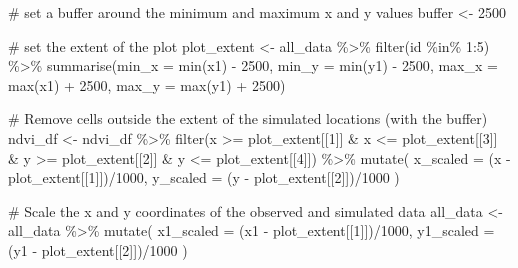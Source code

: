 \documentclass[
  letterpaper,
  DIV=11,
  numbers=noendperiod]{scrartcl}
\newenvironment{Shaded}{\begin{snugshade}}{\end{snugshade}}
\newcommand{\AttributeTok}[1]{\textcolor[rgb]{0.40,0.45,0.13}{#1}}
\newcommand{\CommentTok}[1]{\textcolor[rgb]{0.37,0.37,0.37}{#1}}
\newcommand{\DecValTok}[1]{\textcolor[rgb]{0.68,0.00,0.00}{#1}}
\newcommand{\FunctionTok}[1]{\textcolor[rgb]{0.28,0.35,0.67}{#1}}
\newcommand{\NormalTok}[1]{\textcolor[rgb]{0.00,0.23,0.31}{#1}}
\newcommand{\OtherTok}[1]{\textcolor[rgb]{0.00,0.23,0.31}{#1}}
\newcommand{\SpecialCharTok}[1]{\textcolor[rgb]{0.37,0.37,0.37}{#1}}
\begin{document}
\begin{Shaded}
\begin{Highlighting}[]
\CommentTok{\# set a buffer around the minimum and maximum x and y values}
\NormalTok{buffer }\OtherTok{\textless{}{-}} \DecValTok{2500}

\CommentTok{\# set the extent of the plot}
\NormalTok{plot\_extent }\OtherTok{\textless{}{-}}\NormalTok{ all\_data }\SpecialCharTok{\%\textgreater{}\%} \FunctionTok{filter}\NormalTok{(id }\SpecialCharTok{\%in\%} \DecValTok{1}\SpecialCharTok{:}\DecValTok{5}\NormalTok{) }\SpecialCharTok{\%\textgreater{}\%} 
  \FunctionTok{summarise}\NormalTok{(}\AttributeTok{min\_x =} \FunctionTok{min}\NormalTok{(x1) }\SpecialCharTok{{-}} \DecValTok{2500}\NormalTok{, }\AttributeTok{min\_y =} \FunctionTok{min}\NormalTok{(y1) }\SpecialCharTok{{-}} \DecValTok{2500}\NormalTok{, }\AttributeTok{max\_x =} \FunctionTok{max}\NormalTok{(x1) }\SpecialCharTok{+} \DecValTok{2500}\NormalTok{, }\AttributeTok{max\_y =} \FunctionTok{max}\NormalTok{(y1) }\SpecialCharTok{+} \DecValTok{2500}\NormalTok{)}

\CommentTok{\# Remove cells outside the extent of the simulated locations (with the buffer)}
\NormalTok{ndvi\_df }\OtherTok{\textless{}{-}}\NormalTok{ ndvi\_df }\SpecialCharTok{\%\textgreater{}\%}
  \FunctionTok{filter}\NormalTok{(x }\SpecialCharTok{\textgreater{}=}\NormalTok{ plot\_extent[[}\DecValTok{1}\NormalTok{]] }\SpecialCharTok{\&}\NormalTok{ x }\SpecialCharTok{\textless{}=}\NormalTok{ plot\_extent[[}\DecValTok{3}\NormalTok{]] }\SpecialCharTok{\&} 
\NormalTok{           y }\SpecialCharTok{\textgreater{}=}\NormalTok{ plot\_extent[[}\DecValTok{2}\NormalTok{]] }\SpecialCharTok{\&}\NormalTok{ y }\SpecialCharTok{\textless{}=}\NormalTok{ plot\_extent[[}\DecValTok{4}\NormalTok{]]) }\SpecialCharTok{\%\textgreater{}\%} 
  \FunctionTok{mutate}\NormalTok{(}
    \AttributeTok{x\_scaled =}\NormalTok{ (x }\SpecialCharTok{{-}}\NormalTok{ plot\_extent[[}\DecValTok{1}\NormalTok{]])}\SpecialCharTok{/}\DecValTok{1000}\NormalTok{,}
    \AttributeTok{y\_scaled =}\NormalTok{ (y }\SpecialCharTok{{-}}\NormalTok{ plot\_extent[[}\DecValTok{2}\NormalTok{]])}\SpecialCharTok{/}\DecValTok{1000}
\NormalTok{  )}

\CommentTok{\# Scale the x and y coordinates of the observed and simulated data}
\NormalTok{all\_data }\OtherTok{\textless{}{-}}\NormalTok{ all\_data }\SpecialCharTok{\%\textgreater{}\%}
  \FunctionTok{mutate}\NormalTok{(}
    \AttributeTok{x1\_scaled =}\NormalTok{ (x1 }\SpecialCharTok{{-}}\NormalTok{ plot\_extent[[}\DecValTok{1}\NormalTok{]])}\SpecialCharTok{/}\DecValTok{1000}\NormalTok{,}
    \AttributeTok{y1\_scaled =}\NormalTok{ (y1 }\SpecialCharTok{{-}}\NormalTok{ plot\_extent[[}\DecValTok{2}\NormalTok{]])}\SpecialCharTok{/}\DecValTok{1000}
\NormalTok{  )}
\end{Highlighting}
\end{Shaded}
\end{document}
